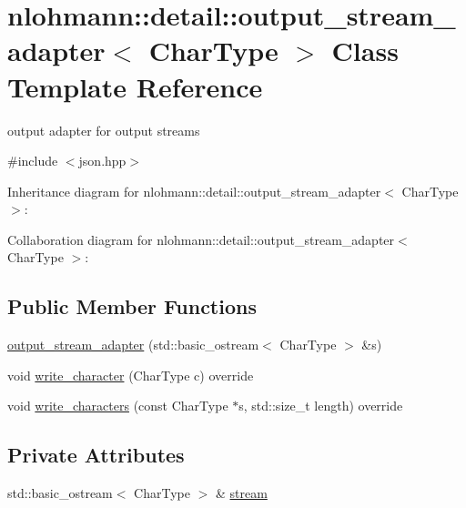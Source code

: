 \hypertarget{classnlohmann_1_1detail_1_1output__stream__adapter}{}\section{nlohmann\+:\+:detail\+:\+:output\+\_\+stream\+\_\+adapter$<$ Char\+Type $>$ Class Template Reference}
\label{classnlohmann_1_1detail_1_1output__stream__adapter}


output adapter for output streams  




{\ttfamily \#include $<$json.\+hpp$>$}



Inheritance diagram for nlohmann\+:\+:detail\+:\+:output\+\_\+stream\+\_\+adapter$<$ Char\+Type $>$\+:


Collaboration diagram for nlohmann\+:\+:detail\+:\+:output\+\_\+stream\+\_\+adapter$<$ Char\+Type $>$\+:
\subsection*{Public Member Functions}
\begin{DoxyCompactItemize}
\item 
\hyperlink{classnlohmann_1_1detail_1_1output__stream__adapter_a4e78a9bd19cbf3a4191adc62d14f0055}{output\+\_\+stream\+\_\+adapter} (std\+::basic\+\_\+ostream$<$ Char\+Type $>$ \&s)
\item 
void \hyperlink{classnlohmann_1_1detail_1_1output__stream__adapter_a6e2698c76b200b2d8fac6cebfc43a245}{write\+\_\+character} (Char\+Type c) override
\item 
void \hyperlink{classnlohmann_1_1detail_1_1output__stream__adapter_ad61375497a7d03cb0bdcddfdaad185d0}{write\+\_\+characters} (const Char\+Type $\ast$s, std\+::size\+\_\+t length) override
\end{DoxyCompactItemize}
\subsection*{Private Attributes}
\begin{DoxyCompactItemize}
\item 
std\+::basic\+\_\+ostream$<$ Char\+Type $>$ \& \hyperlink{classnlohmann_1_1detail_1_1output__stream__adapter_aacc26af02e1e5a988bc5dbfb723b5562}{stream}
\end{DoxyCompactItemize}


